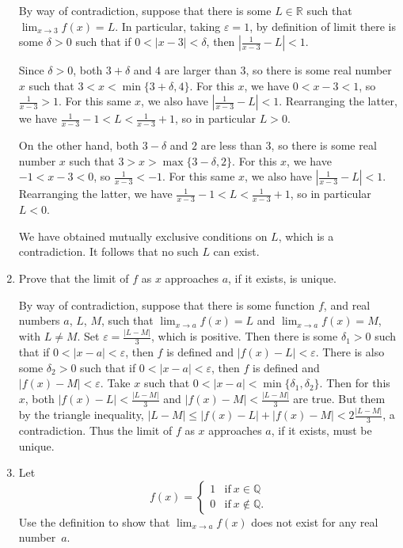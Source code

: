 \documentclass[12pt]{amsart}
\def\de{\delta}
\def\e{\varepsilon}
\newcommand{\Q}{\mathbb{Q}}
\newcommand{\R}{{\mathbb{R}}}
\numberwithin{equation}{section}
\theoremstyle{plain} %
\theoremstyle{definition}
\theoremstyle{remark}
\begin{document}
\begin{enumerate}
\begin{framed}
By way of contradiction, suppose that there is some $L\in \R$ such that $\lim_{x\to 3} f(x) = L$. In particular, taking $\e=1$, by definition of limit there is some $\delta>0$ such that if $0<|x-3|<\de$, then $|\frac{1}{x-3} - L| < 1$. 

Since $\de>0$, both $3+\de$ and $4$ are larger than $3$, so there is some real number $x$ such that $3<x<\min\{3+\de,4\}$. For this $x$, we have
$0< x-3<1$, so $\frac{1}{x-3}>1$. For this same $x$, we also have $|\frac{1}{x-3} - L| < 1$. Rearranging the latter, we have $\frac{1}{x-3} - 1 < L < \frac{1}{x-3} + 1$, so in particular $L>0$. 

On the other hand, both $3-\de$ and $2$ are less than $3$, so there is some real number $x$ such that $3>x>\max\{3-\de,2\}$. For this $x$, we have
$-1< x-3<0$, so $\frac{1}{x-3}<-1$. For this same $x$, we also have $|\frac{1}{x-3} - L| < 1$. Rearranging the latter, we have $\frac{1}{x-3} - 1 < L < \frac{1}{x-3} + 1$, so in particular $L<0$.

We have obtained mutually exclusive conditions on $L$, which is a contradiction. It follows that no such $L$ can exist. 

\end{framed}



\item Prove that the limit of $f$ as $x$ approaches $a$, if it exists, is unique.

\begin{framed}
By way of contradiction, suppose that there is some function $f$, and real numbers $a$, $L$, $M$, such that $\lim_{x\to a} f(x) = L$ and $\lim_{x\to a} f(x) = M$, with $L\neq M$. Set $\e = \frac{ |L-M|}{3}$, which is positive. Then there is some $\delta_1>0$ such that if $0<|x-a|<\e$, then $f$ is defined and $|f(x)-L|<\e$. There is also some $\delta_2>0$ such that if $0<|x-a|<\e$, then $f$ is defined and $|f(x)-M|<\e$. Take $x$ such that $0<|x-a|<\min\{\delta_1,\delta_2\}$. Then for this $x$, both $|f(x)-L|<\frac{ |L-M|}{3}$ and $|f(x)-M|<\frac{ |L-M|}{3}$ are true. But them by the triangle inequality, 
$ |L-M| \leq |f(x)-L| + |f(x)-M| < 2 \frac{ |L-M|}{3}$, a contradiction. Thus the limit of $f$ as $x$ approaches $a$, if it exists, must be unique.
\end{framed}

\item Let
\[ f(x) = \begin{cases} 1 & \text{if} \ x\in \Q \\ 
0 & \text{if} \ x\notin \Q.\end{cases}\]
Use the definition to show that $\lim_{x\to a} f(x)$ does not exist for any real number~$a$.

	\end{enumerate}
	
\end{document}
